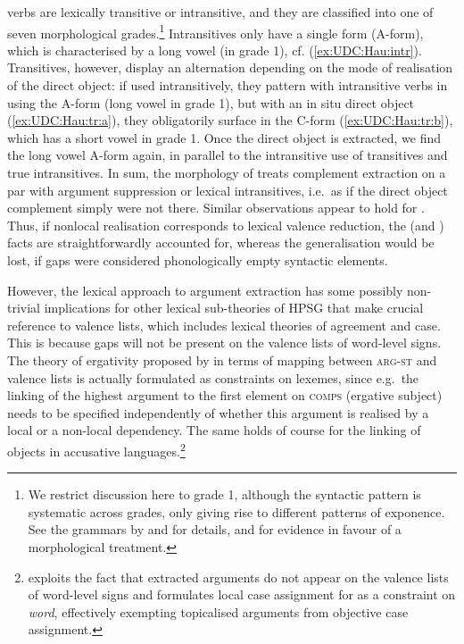 \documentclass[output=paper
,notxmath 
 	        ,biblatex
                ,babelshorthands
                ,newtxmath
                ,draftmode
                ,colorlinks, citecolor=brown
]{langscibook}
\begin{document}
\noindent
{} verbs are lexically transitive or intransitive, and they
are classified into one of seven morphological grades.\footnote{We
  restrict discussion here to grade 1, although the syntactic pattern
  is systematic across grades, only giving rise to different patterns
  of exponence. See the  grammars by \citet{newman_p00} and
  \citet{jaggar01:_hausa} for details, and \citet{crysmann_b04yom} for
  evidence in favour of a morphological treatment. } Intransitives
only have a single form (A-form), which is characterised by a long
vowel (in grade 1), cf. (\ref{ex:UDC:Hau:intr}). Transitives, however,
display an alternation depending on the mode of realisation of the
direct object: if used intransitively, they pattern with intransitive
verbs in using the A-form (long vowel in grade 1), but with an in situ
direct object (\ref{ex:UDC:Hau:tr:a}), they obligatorily surface in
the C-form (\ref{ex:UDC:Hau:tr:b}), which has a short vowel in grade
1. Once the direct object is extracted, we find the long vowel A-form
again, in parallel to the intransitive use of transitives and true
intransitives. In sum, the morphology of  treats complement
extraction on a par with argument suppression or lexical
intransitives, i.e.\ as if the direct object complement simply were
not there. Similar observations appear to hold for 
\citep[Section~4.2.3]{Henri2010a-u}. Thus, if nonlocal realisation
corresponds to lexical valence reduction, the  (and
) facts are straightforwardly accounted for, whereas
the generalisation would be lost, if gaps were considered
phonologically empty syntactic elements.


However, the lexical approach to argument extraction has some possibly
non-trivial implications for other lexical sub-theories of HPSG that
make crucial reference to valence lists, which includes lexical
theories of agreement and case. This is because gaps will not be
present on the valence lists of word-level signs. The theory of
ergativity proposed by \citet[Section~5.2]{Manning:Sag:99} in terms of
mapping between \textsc{arg-st} and valence lists is actually
formulated as constraints on lexemes, since e.g.\ the linking of the
highest argument to the first element on \textsc{comps} (ergative
subject) needs to be specified independently of whether this argument
is realised by a local or a non-local dependency. The same holds of
course for the linking of objects in accusative
languages.\footnote{\citet{Crysmann:09} exploits the fact that
  extracted arguments do not appear on the valence lists of word-level
  signs and formulates local case assignment for  as a
  constraint on \textit{word}, effectively exempting topicalised
  arguments from objective case assignment.}
\end{document}
